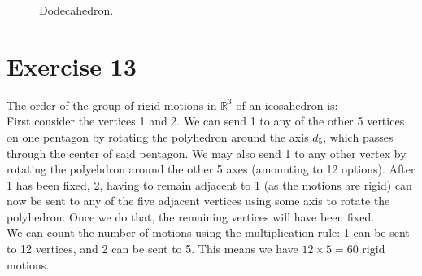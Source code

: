 \documentclass[12pt]{article}
\newcommand{\R}{\mathbb{R}}
\begin{document}
\begin{figure}[H]
        \caption{\label{fig:figure1} Dodecahedron.}
    \end{figure}


    \section*{Exercise 13}
    The order of the group of rigid motions in $\R^3$ of an icosahedron is: \\
    First consider the vertices 1 and 2.
    We can send 1 to any of the other 5 vertices on one pentagon by
    rotating the polyhedron around the axis $d_5$, which passes through
    the center of said pentagon. We may also send 1 to any other vertex
    by rotating the polyehdron around the other 5 axes (amounting to 12 
    options).
    After 1 has been fixed, 2, having to remain adjacent to 1 (as the
    motions are rigid) can now be sent to any of the five adjacent vertices
    using some axis to rotate the polyhedron. Once we do that, the
    remaining vertices will have been fixed. \\
    We can count the number of motions using the multiplication rule:
    1 can be sent to 12 vertices, and 2 can be sent to 5. This means we
    have $12 \times 5 = 60$ rigid motions. 
\end{document}

